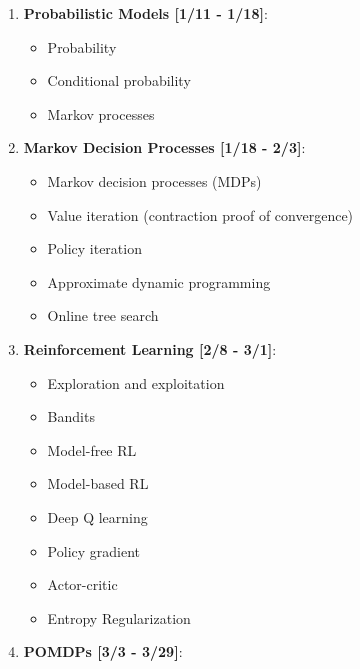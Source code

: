 \documentclass[9pt]{article}
\begin{document}
\begin{enumerate}[noitemsep]
    \item \textbf{Probabilistic Models [1/11 - 1/18]}:
        \begin{multicols}{2}
            \begin{itemize}[noitemsep]
                \item Probability
                \item Conditional probability
                \item Markov processes
            \end{itemize}
        \end{multicols}
    \item \textbf{Markov Decision Processes [1/18 - 2/3]}:
        \begin{multicols}{2}
        \begin{itemize}[noitemsep]
            \item Markov decision processes (MDPs)
            \item Value iteration (contraction proof of convergence)
            \item Policy iteration
            \item Approximate dynamic programming
            \item Online tree search
        \end{itemize}
        \end{multicols}
    \item \textbf{Reinforcement Learning [2/8 - 3/1]}:
        \begin{multicols}{2}
        \begin{itemize}[noitemsep]
            \item Exploration and exploitation
            \item Bandits
            \item Model-free RL
            \item Model-based RL
            \item Deep Q learning
            \item Policy gradient
            \item Actor-critic
            \item Entropy Regularization
        \end{itemize}
        \end{multicols}
    \item \textbf{POMDPs [3/3 - 3/29]}:
        \begin{multicols}{2}

\end{multicols}
\end{enumerate}
\end{document}
